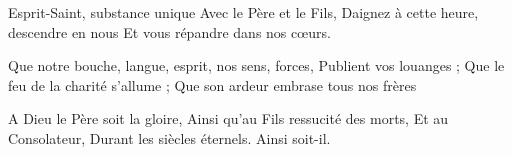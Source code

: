 Esprit-Saint, substance unique
Avec le Père et le Fils,
Daignez à cette heure, descendre en nous
Et vous répandre dans nos cœurs.

Que notre bouche, langue, esprit, nos sens, forces,
Publient vos louanges ;
Que le feu de la charité s'allume ;
Que son ardeur embrase tous nos frères

A Dieu le Père soit la gloire,
Ainsi qu'au Fils ressucité des morts,
Et au Consolateur,
Durant les siècles éternels.
Ainsi soit-il.